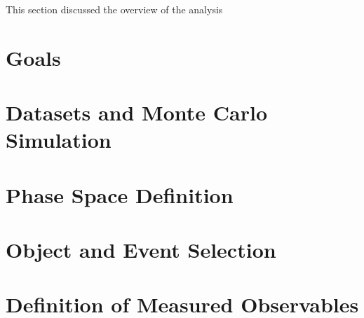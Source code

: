 \label{sec:AnalysisOverview}
This section discussed the overview of the analysis

\section{Goals}
\label{sec:Analysis_Goals}


\section{Datasets and Monte Carlo Simulation}
\label{sec:DataSetAndMonteCarlo}


\section{Phase Space Definition}
\label{sec:FidSel}


\section{Object and Event Selection}
\label{sec:ObjectEventSel}


\section{Definition of Measured Observables}
\label{sec:Obs}
